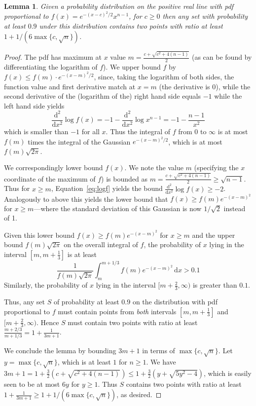 \documentclass[11pt,letter]{article}
\renewcommand{\d}{\mathrm{d}}
\newcounter{nTheorems}
\numberwithin{nTheorems}{section}
\newtheorem{lemma}[nTheorems]{Lemma}
\begin{document}
\begin{lemma}\label{lem:tail}
  Given a probability distribution on the positive real line with pdf proportional to $f(x)=e^{-(x-c)^2/2}x^{n-1}$, for $c\geq 0$ then any set with probability at least $0.9$ under this distribution contains two points with ratio at least $1+1/(6\max\{c,\sqrt{n}\})$.
\end{lemma}
\begin{proof}

  The pdf has maximum at $x$ value $m=\frac{c+\sqrt{c^2+4(n-1)}}{2}$ (as can be found by differentiating the logarithm of $f$). We upper bound $f$ by $f(x)\leq f(m)\cdot e^{-(x-m)^2/2}$, since, taking the logarithm of both sides, the function value and first derivative match at $x=m$ (the derivative is 0), while the second derivative of the (logarithm of the) right hand side equals $-1$ while the left hand side yields \begin{equation}\label{eq:logf}\frac{\d^2}{\d x^2}\log f(x) =-1-\frac{\d^2}{\d x^2}\log x^{n-1}=-1-\frac{n-1}{x^2}\end{equation} which is smaller than $-1$ for all $x$. Thus the integral of $f$ from 0 to $\infty$ is at most $f(m)$ times the integral of the Gaussian $e^{-(x-m)^2/2}$, which is at most $f(m)\sqrt{2\pi}$.

  We correspondingly lower bound $f(x)$. We note the value $m$ (specifying the $x$ coordinate of the maximum of $f$) is bounded as $m=\frac{c+\sqrt{c^2+4(n-1)}}{2}\geq \sqrt{n-1}$. Thus for $x\geq m$, Equation~\ref{eq:logf} yields the bound $\frac{\d^2}{\d x^2}\log f(x)\geq -2$. Analogously to above this yields the lower bound that $f(x)\geq f(m) e^{-(x-m)^2}$ for $x\geq m$---where the standard deviation of this Gaussian is now $1/\sqrt{2}$ instead of 1.

  Given this lower bound $f(x)\geq f(m) e^{-(x-m)^2}$ for $x\geq m$ and the upper bound $f(m)\sqrt{2\pi}$ on the overall integral of $f$, the probability of $x$ lying in the interval $[m,m+\frac{1}{3}]$ is at least $$\frac{1}{f(m)\sqrt{2\pi}}\int_{m}^{m+1/3} f(m) e^{-(x-m)^2}\,\d x > 0.1$$ Similarly, the probability of $x$ lying in the interval $[m+\frac{2}{3},\infty)$ is greater than $0.1$.

  Thus, any set $S$ of probability at least $0.9$ on the distribution with pdf proportional to $f$ must contain points from \emph{both} intervals $[m,m+\frac{1}{3}]$ and $[m+\frac{2}{3},\infty)$. Hence $S$ must contain two points with ratio at least $\frac{m+2/3}{m+1/3}=1+\frac{1}{3m+1}$.

  We conclude the lemma by bounding $3m+1$ in terms of $\max\{c,\sqrt{n}\}$. Let $y=\max\{c,\sqrt{n}\}$, which is at least $1$ for $n\geq 1$. We have $3m+1=1+\frac{3}{2}(c+\sqrt{c^2+4(n-1)})\leq 1+\frac{3}{2}(y+\sqrt{5y^2-4})$, which is easily seen to be at most $6y$ for $y\geq 1$. Thus $S$ contains two points with ratio at least $1+\frac{1}{3m+1}\geq 1+1/(6\max\{c,\sqrt{n}\})$, as desired.


\end{proof}
\end{document}
